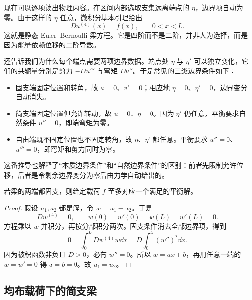 现在可以逐项读出物理内容。在区间内部选取支集远离端点的 \(\eta\)，边界项自动为零。由于这样的 \(\eta\) 任意，微积分基本引理给出
\begin{equation}
 Du^{(4)}(x)=f(x),\qquad 0<x<L.
 \label{eq:phys-cont-euler-bernoulli-static}
\end{equation}
这就是静态 Euler--Bernoulli 梁方程。它是四阶而不是二阶，并非人为选择，而是因为能量依赖位移的二阶导数。

还告诉我们为什么每个端点需要两项边界数据。端点处 \(\eta\) 与 \(\eta'\) 可以独立变化，它们的共轭量分别是剪力 \(-Du'''\) 与弯矩 \(Du''\)。于是常见的三类边界条件如下：
\begin{itemize}
 \item 固支端固定位置和转角，故 \(u=0\)、\(u'=0\)；相应地 \(\eta=0\)、\(\eta'=0\)，边界变分自动消失。
 \item 简支端固定位置但允许转动，故 \(u=0\)、\(\eta=0\)。因为 \(\eta'\) 仍任意，平衡要求自然条件 \(u''=0\)，即端弯矩为零。
 \item 自由端既不固定位置也不固定转角，故 \(\eta\)、\(\eta'\) 都任意。平衡要求 \(u''=0\)、\(u'''=0\)，即弯矩和剪力同时为零。
\end{itemize}
这番推导也解释了“本质边界条件”和“自然边界条件”的区别：前者先限制允许位移，后者是令剩余边界变分为零后由力学自动给出的。

\begin{proposition}[固支梁平衡解的唯一性]
若梁的两端都固支，则给定载荷 \(f\) 至多对应一个满足的平衡解。
\end{proposition}

\begin{proof}
假设 \(u_1,u_2\) 都是解，令 \(w=u_1-u_2\)。于是
\[
 Dw^{(4)}=0,
 \qquad
 w(0)=w'(0)=w(L)=w'(L)=0.
\]
方程乘以 \(w\) 并积分，再按分部积分两次。固支条件消去全部边界项，得到
\[
 0=\int_0^L Dw^{(4)}w\dd x
 =D\int_0^L(w'')^2\dd x.
\]
因为被积函数非负且 \(D>0\)，必有 \(w''=0\)。所以 \(w=ax+b\)，再用任意一端的 \(w=w'=0\) 得 \(a=b=0\)。故 \(u_1=u_2\)。
\end{proof}

\subsection{均布载荷下的简支梁}

